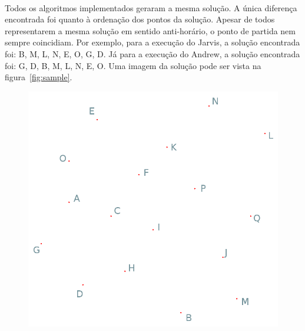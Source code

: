 \documentclass[11pt,a4paper]{article}
\begin{document}
    \paragraph{}
    Todos os algoritmos implementados geraram a mesma solução. A única diferença encontrada foi quanto à ordenação dos pontos da solução. Apesar de todos representarem a mesma solução em sentido anti-horário, o ponto de partida nem sempre coincidiam. Por exemplo, para a execução do Jarvis, a solução encontrada foi: B, M, L, N, E, O, G, D. Já para a execução do Andrew, a solução encontrada foi: G, D, B, M, L, N, E, O. Uma imagem da solução pode ser vista na figura~\ref{fig:sample}.
        \begin{figure}[htb]
            \captionsetup{justification=centering,margin=2cm}
            \centering
              \begin{minipage}[b]{0.4\textwidth}
              \centering
                  \includegraphics[width=.9\linewidth]{test_sample_input}
                \end{minipage}
              \begin{minipage}[b]{0.4\textwidth}
              \centering

\end{minipage}
\end{figure}
\end{document}
